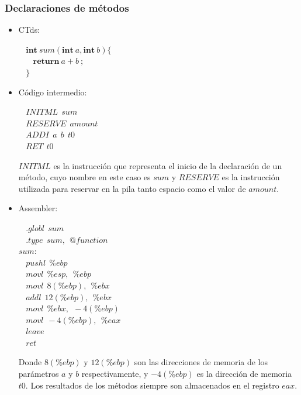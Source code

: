 \documentclass[11pt,a4paper]{article}
\begin{document}
\subsubsection{Declaraciones de métodos}
\begin{itemize}
	\item CTds:
		\begin{flushleft}
			$\ \ \ \ \textbf{int} \ sum(\textbf{int} \ a,\textbf{int} \ b) \{$ \\
			$\ \ \ \ \ \ \ \ \textbf{return} \ a + 	b \ ;$ \\
			$\ \ \ \ \}$
		\end{flushleft}
	\item Código intermedio:
		\begin{flushleft}
			$\ \ \ \ INITML \ \ sum$ \\
			$\ \ \ \ RESERVE \ \ amount$ \\
			$\ \ \ \ ADDI \ \ a \ \ b \ \ t0$ \\
			$\ \ \ \ RET \ \ t0$
		\end{flushleft}
		$INITML$ es la instrucción que representa el inicio de la declaración de un método, cuyo nombre en este caso es $sum$ y $RESERVE$ es la instrucción utilizada para reservar en la pila tanto espacio como el valor de $amount$.
	\item Assembler:
		\begin{flushleft}
			$\ \ \ \ .globl \ \ sum$ \\
			$\ \ \ \ .type \ \ sum, \ \ @function $ \\
			$sum:$ \\
			$\ \ \ \ pushl \ \ \%ebp$ \\
			$\ \ \ \ movl \ \ \%esp, \ \ \%ebp$ \\
			$\ \ \ \ movl \ \ 8(\%ebp), \ \ \%ebx$ \\
			$\ \ \ \ addl \ \ 12(\%ebp), \ \ \%ebx$ \\
			$\ \ \ \ movl \ \ \%ebx, \ \ -4(\%ebp)$ \\
			$\ \ \ \ movl \ \ -4(\%ebp), \ \ \%eax$ \\
			$\ \ \ \ leave$ \\
			$\ \ \ \ ret$	
		\end{flushleft}
		Donde $8(\%ebp)$ y $12(\%ebp)$ son las direcciones de memoria de los parámetros $a$ y $b$ respectivamente, y $-4(\%ebp)$ es la dirección de memoria $t0$. Los resultados de los métodos siempre son almacenados en el registro $eax$. 
\end{itemize}
\end{document}
